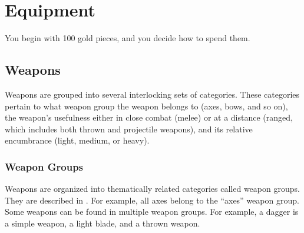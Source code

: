 \chapter{Equipment}

You begin with 100 gold pieces, and you decide how to spend them.
\section{Weapons}

Weapons are grouped into several interlocking sets of categories. These categories pertain to what weapon group the weapon belongs to (axes, bows, and so on), the weapon's usefulness either in close combat (melee) or at a distance (ranged, which includes both thrown and projectile weapons), and its relative encumbrance (light, medium, or heavy).

\subsection{Weapon Groups}

Weapons are organized into thematically related categories called weapon groups. They are described in . For example, all axes belong to the ``axes'' weapon group. Some weapons can be found in multiple weapon groups. For example, a dagger is a simple weapon, a light blade, and a thrown weapon.

